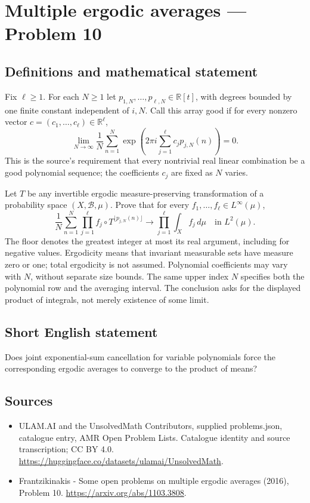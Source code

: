 \documentclass[11pt,a4paper]{article}
\begin{document}
\section*{Multiple ergodic averages — Problem 10}\label{statement}

\subsection{Definitions and mathematical statement}
Fix $\ell\ge1$. For each $N\ge1$ let
$p_{1,N},\ldots,p_{\ell,N}\in\mathbb R[t]$, with degrees
bounded by one finite constant independent of $i,N$.
Call this array good if for every nonzero vector
$c=(c_1,\ldots,c_\ell)\in\mathbb R^\ell$,
\[
       \lim_{N\to\infty}\frac1N\sum_{n=1}^N
           \exp\!\left(2\pi i\sum_{j=1}^\ell
                                   c_jp_{j,N}(n)\right)=0.
\]
This is the source's requirement that every nontrivial
real linear combination be a good polynomial sequence;
the coefficients $c_j$ are fixed as $N$ varies.

Let $T$ be any invertible ergodic measure-preserving
transformation of a probability space $(X,\mathcal B,\mu)$.
Prove that for every $f_1,\ldots,f_\ell\in L^\infty(\mu)$,
\[
 \frac1N\sum_{n=1}^N\prod_{j=1}^\ell
       f_j\circ T^{\lfloor p_{j,N}(n)\rfloor}
       \longrightarrow\prod_{j=1}^\ell\int_X f_j\,d\mu
                        \quad\text{in }L^2(\mu).
\]
The floor denotes the greatest integer at most its real
argument, including for negative values. Ergodicity means
that invariant measurable sets have measure zero or one;
total ergodicity is not assumed. Polynomial coefficients
may vary with $N$, without separate size bounds. The
same upper index $N$ specifies both the polynomial row
and the averaging interval. The conclusion asks for the
displayed product of integrals, not merely existence of
some limit.
\subsection{Short English statement}
Does joint exponential-sum cancellation for variable polynomials force the corresponding ergodic averages to converge to the product of means?
\subsection{Sources}
\begin{itemize}
\item[S1] ULAM.AI and the UnsolvedMath Contributors, supplied problems.json, catalogue entry, AMR Open Problem Lists. Catalogue identity and source transcription; CC BY 4.0.
\url{https://huggingface.co/datasets/ulamai/UnsolvedMath}.
\item[S2] Frantzikinakis - Some open problems on multiple ergodic averages (2016), Problem 10. 
\url{https://arxiv.org/abs/1103.3808}.
\end{itemize}
\end{document}
